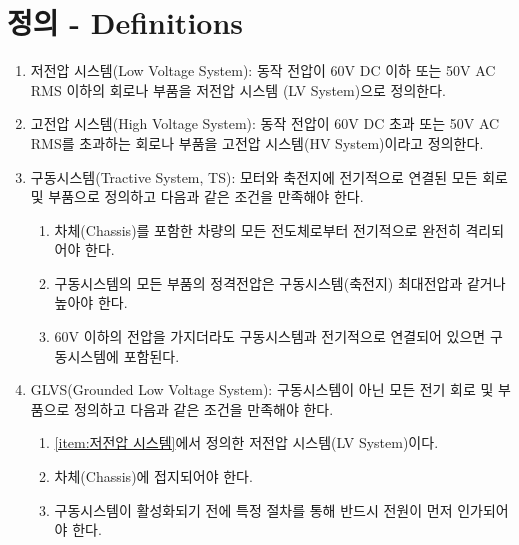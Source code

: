 \documentclass[final,a4paper,10pt]{report}
\begin{document}
\section{정의 - Definitions}\label{rule:formula-technical.definitions}
\begin{enumerate}
  \item\label{rule:formula-technical.definitions.lv-system} 저전압 시스템(Low Voltage System): 동작 전압이 60V DC 이하 또는 50V AC RMS 이하의 회로나 부품을 저전압 시스템 (LV System)으로 정의한다. \label{item:저전압 시스템}
  \item\label{rule:formula-technical.definitions.hv-system} 고전압 시스템(High Voltage System): 동작 전압이 60V DC 초과 또는 50V AC RMS를 초과하는 회로나 부품을 고전압 시스템(HV System)이라고 정의한다.
  \item\label{rule:formula-technical.definitions.tractive-system} 구동시스템(Tractive System, TS): 모터와 축전지에 전기적으로 연결된 모든 회로 및 부품으로 정의하고 다음과 같은 조건을 만족해야 한다. \label{item:구동시스템}
    \begin{enumerate}
      \item\label{rule:formula-technical.definitions.tractive-system.isolated-from-chassis-conductors} 차체(Chassis)를 포함한 차량의 모든 전도체로부터 전기적으로 완전히 격리되어야 한다.
      \item\label{rule:formula-technical.definitions.tractive-system.min-component-voltage-rating} 구동시스템의 모든 부품의 정격전압은 구동시스템(축전지) 최대전압과 같거나 높아야 한다.
      \item\label{rule:formula-technical.definitions.tractive-system.low-voltage-parts-included} 60V 이하의 전압을 가지더라도 구동시스템과 전기적으로 연결되어 있으면 구동시스템에 포함된다.
    \end{enumerate}

  \item\label{rule:formula-technical.definitions.glvs} GLVS(Grounded Low Voltage System): 구동시스템이 아닌 모든 전기 회로 및 부품으로 정의하고 다음과 같은 조건을 만족해야 한다.
    \begin{enumerate}
      \item\label{rule:formula-technical.definitions.glvs.is-lv-system} \ref{item:저전압 시스템}에서 정의한 저전압 시스템(LV System)이다.
      \item\label{rule:formula-technical.definitions.glvs.grounded-to-chassis} 차체(Chassis)에 접지되어야 한다.
      \item\label{rule:formula-technical.definitions.glvs.powered-before-ts-activation} 구동시스템이 활성화되기 전에 특정 절차를 통해 반드시 전원이 먼저 인가되어야 한다.
    \end{enumerate}


\end{enumerate}
\end{document}
